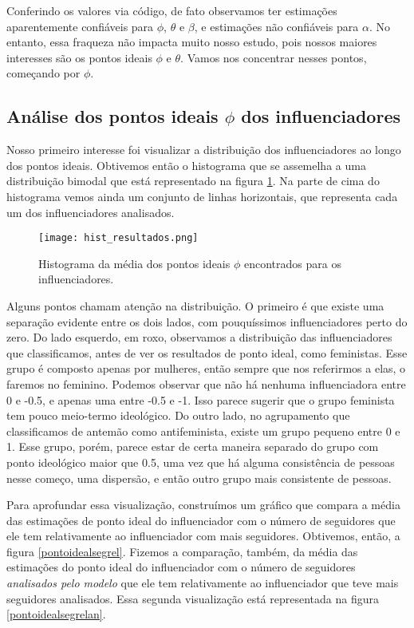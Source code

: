 \documentclass[
	12pt,				%
	openright,			%
	twoside,			%
	a4paper,			%
	english,			%
	brazil				%
	]{abntex2}
\begin{document}
 Conferindo os valores via código, de fato observamos ter estimações aparentemente confiáveis para $\phi$, $\theta$ e $\beta$, e estimações não confiáveis para $\alpha$. No entanto, essa fraqueza não impacta muito nosso estudo, pois nossos maiores interesses são os pontos ideais $\phi$ e $\theta$. Vamos nos concentrar nesses pontos, começando por $\phi$.
 
 \subsection*{Análise dos pontos ideais $\phi$ dos influenciadores}\label{ptoidealinf}
 Nosso primeiro interesse foi visualizar a distribuição dos influenciadores ao longo dos pontos ideais. Obtivemos então o histograma que se assemelha a uma distribuição bimodal que está representado na figura \ref{histresultados}. Na parte de cima do histograma vemos ainda um conjunto de linhas horizontais, que representa cada um dos influenciadores analisados.

 \begin{figure}[!htbp]
    \centering
    \texttt{[image: hist\_resultados.png]}
    \caption{Histograma da média dos pontos ideais $\phi$ encontrados para os influenciadores.}
    \label{histresultados}
 \end{figure}
 
 Alguns pontos chamam atenção na distribuição. O primeiro é que existe uma separação evidente entre os dois lados, com pouquíssimos influenciadores perto do zero. Do lado esquerdo, em roxo, observamos a distribuição das influenciadores que classificamos, antes de ver os resultados de ponto ideal, como feministas. Esse grupo é composto apenas por mulheres, então sempre que nos referirmos a elas, o faremos no feminino. Podemos observar que não há nenhuma influenciadora entre 0 e -0.5, e apenas uma entre -0.5 e -1. Isso parece sugerir que o grupo feminista tem pouco meio-termo ideológico. Do outro lado, no agrupamento que classificamos de antemão como antifeminista, existe um grupo pequeno entre 0 e 1. Esse grupo, porém, parece estar de certa maneira separado do grupo com ponto ideológico maior que 0.5, uma vez que há alguma consistência de pessoas nesse começo, uma dispersão, e então outro grupo mais consistente de pessoas.
 
 Para aprofundar essa visualização, construímos um gráfico que compara a média das estimações de ponto ideal do influenciador com o número  de seguidores que ele tem relativamente ao influenciador com mais seguidores. Obtivemos, então, a figura \ref{pontoidealsegrel}. Fizemos a comparação, também, da média das estimações do ponto ideal do influenciador com o número de seguidores \textit{analisados pelo modelo} que ele tem relativamente ao influenciador que teve mais seguidores analisados. Essa segunda visualização está representada na figura \ref{pontoidealsegrelan}.
\end{document}
